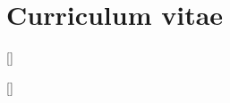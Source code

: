 \chapter*{Curriculum vitae}
\pagestyle{plain}
\fancyfoot[RE, LO]{\thepage}


\titleformat{\section}{\scshape\raggedright\large}{}{0em}{}[\color{black}\titlerule]
\titleformat{\subsection}{\bfseries\raggedright\large}{}{0em}{}[]


\newcommand{\CVAuthor}{Lukas Valentin Graf, MSc Paris-Lodron University, Salzburg, in Applied Geoinformatics}


